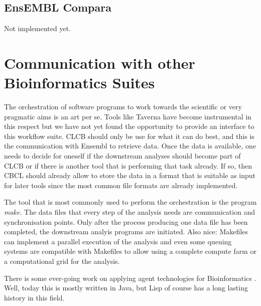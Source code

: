 \documentclass{book}
\newcommand\ensembl{EnsEMBL }
\newcommand\CLCB{CLCB }
\begin{document}
\subsection{\ensembl Compara}

Not implemented yet.

\section{Communication with other Bioinformatics Suites}

The orchestration of software programs to work towards the scientific
or very pragmatic aims is an art per se. Tools like Taverna have become
instrumental in this respect but we have not yet found the opportunity
to provide an interface to this workflow suite. \CLCB should only be
use for what it can do best, and this is the communication with Ensembl
to retrieve data. Once the data is available, one needs to decide for
oneself if the downstream analyses should become part of \CLCB or if
there is another tool that is performing that task already. If so,
then CBCL should already allow to store the data in a format that is
suitable as input for later tools since the most common file formats
are already implemented.

The tool that is most commonly used to perform the orchestration is 
the program {\em make}. The data files that every step of the analysis needs
are communication and synchronisation points. Only after the process producing one
data file has been completed, the downstream analyis programs are initiated.
Also nice: Makefiles can implement a parallel execution of the analysis and 
even some queuing systems are compatible with Makefiles to allow using a complete
compute farm or a computational grid for the analysis.

There is some ever-going work on applying agent technologies for
Bioinformatics \cite{agents:2007}. Well, today this is mostly written
in Java, but Lisp of course has a long lasting history in this field.




\end{document}
